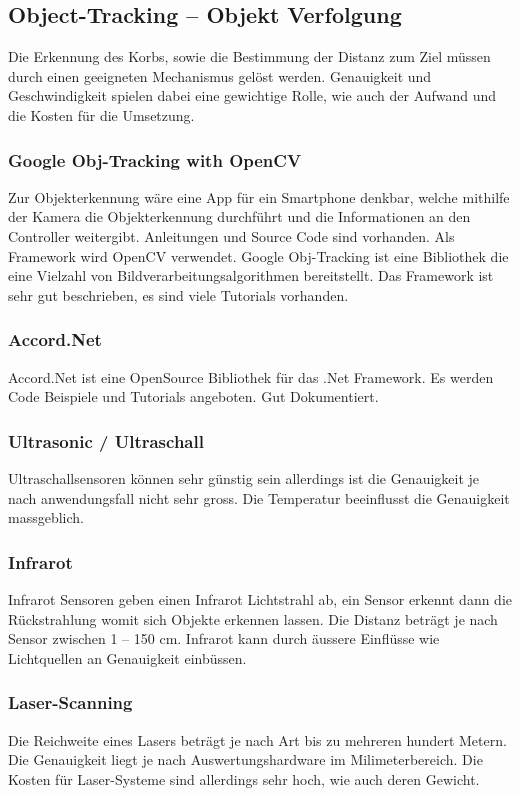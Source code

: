 \subsection{Object-Tracking – Objekt Verfolgung}
Die Erkennung des Korbs, sowie die Bestimmung der Distanz zum Ziel müssen durch einen geeigneten Mechanismus gelöst werden. Genauigkeit und Geschwindigkeit spielen dabei eine gewichtige Rolle, wie auch der Aufwand und die Kosten für die Umsetzung.

\subsubsection{Google Obj-Tracking with OpenCV}
Zur Objekterkennung wäre eine App für ein Smartphone denkbar, welche mithilfe der Kamera die Objekterkennung durchführt und die Informationen an den Controller weitergibt. Anleitungen und Source Code sind vorhanden. Als Framework wird OpenCV verwendet. Google Obj-Tracking ist eine Bibliothek die eine Vielzahl von Bildverarbeitungsalgorithmen bereitstellt. Das Framework ist sehr gut beschrieben, es sind viele Tutorials vorhanden.

\subsubsection{Accord.Net}
Accord.Net ist eine OpenSource Bibliothek für das .Net Framework. Es werden Code Beispiele und Tutorials angeboten. Gut Dokumentiert.

\subsubsection{Ultrasonic / Ultraschall }
Ultraschallsensoren können sehr günstig sein allerdings ist die Genauigkeit je nach anwendungsfall nicht sehr gross. Die Temperatur beeinflusst die Genauigkeit massgeblich. 

\subsubsection{Infrarot}
Infrarot Sensoren geben einen Infrarot Lichtstrahl ab, ein Sensor erkennt dann die Rückstrahlung womit sich Objekte erkennen lassen. Die Distanz beträgt je nach Sensor zwischen 1 – 150 cm. Infrarot kann durch äussere Einflüsse wie Lichtquellen an Genauigkeit einbüssen.

\subsubsection{Laser-Scanning}
Die Reichweite eines Lasers beträgt je nach Art bis zu mehreren hundert Metern. Die Genauigkeit liegt je nach Auswertungshardware im Milimeterbereich. Die Kosten für Laser-Systeme sind allerdings sehr hoch, wie auch deren Gewicht.

